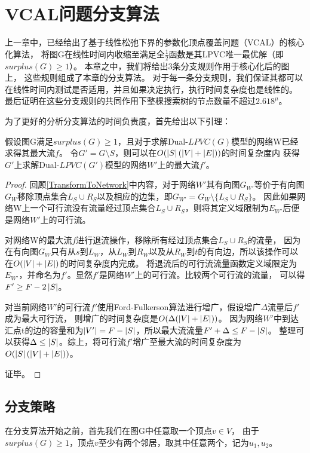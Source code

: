 \section{VCAL问题分支算法}
上一章中，已经给出了基于线性松弛下界的参数化顶点覆盖问题（VCAL）的核心化算法，
将图G在线性时间内收缩至满足全$\frac{1}{2}$函数是其LPVC唯一最优解（即$surplus(G) \ge 1$）。
本章之中，我们将给出3条分支规则作用于核心化后的图上，
这些规则组成了本章的分支算法。
对于每一条分支规则，我们保证其都可以在线性时间内测试是否适用，并且如果决定执行，执行时间复杂度也是线性的。
最后证明在这些分支规则的共同作用下整棵搜索树的节点数量不超过$2.618^\mu$。

\vspace{0.5cm}
为了更好的分析分支算法的时间负责度，首先给出以下引理：
\begin{lemma} \label{LemmaUpdateMaxflow}
假设图G满足$surplus(G) \ge 1$，且对于求解Dual-$LPVC(G)$模型的网络W已经求得其最大流$f$。
令$G' = G \setminus S$，则可以在$O(\left\vert S \right\vert(\left\vert V \right\vert + \left\vert E \right\vert))$的时间复杂度内
获得$G'$上求解Dual-$LPVC(G')$模型的网络$W'$上的最大流$f'$。
\end{lemma}

\begin{proof}
回顾\ref{TransformToNetwork}中内容，对于网络$W'$其有向图$G_{W'}$等价于有向图$G_W$移除顶点集合$L_S \cup R_S$以及相应的边集，即$G_{W'} = G_W \setminus \{L_S \cup R_S\}$。
因此如果网络W上一个可行流没有流量经过顶点集合$L_S \cup R_S$，则将其定义域限制为$E_{W'}$后便是网络$W'$上的可行流。

对网络W的最大流$f$进行退流操作，移除所有经过顶点集合$L_S \cup R_S$的流量，
因为在有向图$G_W$只有从$s$到$L_W$，从$L_W$到$R_W$以及从$R_W$到$t$的有向边，所以该操作可以在$O(\left\vert V \right\vert + \left\vert E \right\vert)$的时间复杂度内完成。
将退流后的可行流流量函数定义域限定为$E_{W'}$，并命名为$f'$。显然$f'$是网络$W'$上的可行流。比较两个可行流的流量，
可以得$F' \ge F - 2 \left\vert S \right\vert$。

对当前网络$W'$的可行流$f'$使用Ford-Fulkerson算法进行增广，假设增广$\Delta$流量后$f'$成为最大可行流，
则增广的时间复杂度是$O(\Delta(\left\vert V \right\vert + \left\vert E \right\vert))$。
因为网络$W'$中到达汇点t的边的容量和为$\left\vert V' \right\vert = F - \left\vert S \right\vert$，所以最大流流量$F' + \Delta \le F - \left\vert S \right\vert$。
整理可以获得$\Delta \le \left\vert S \right\vert$。综上，将可行流$f'$增广至最大流的时间复杂度为$O(\left\vert S \right\vert(\left\vert V \right\vert + \left\vert E \right\vert))$。

证毕。
\end{proof}


\subsection{分支策略}
在分支算法开始之前，首先我们在图G中任意取一个顶点$v \in V$，
由于$surplus(G) \ge 1$，顶点$v$至少有两个邻居，取其中任意两个，记为$u_1, u_2$。


